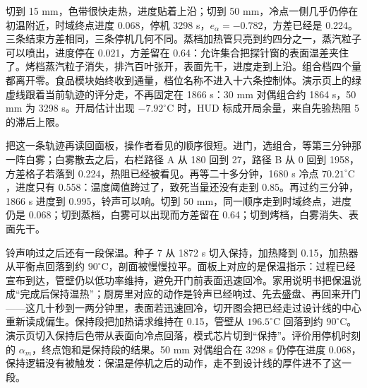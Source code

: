 切到 15 mm，色带很快走热，进度贴着上沿；切到 50 mm，冷点一侧几乎仍停在初温附近，时域终点进度 0.068，停机 3298 s，\(e_{\alpha}=-0.782\)，方差已经是 0.224。三条结束方差相同，三条停机几何不同。蒸档加热管只亮到约四分之一，蒸汽粒子可以喷出，进度停在 0.021，方差留在 0.64：允许集合把探针窗的表面温差夹住了。烤档蒸汽粒子消失，排汽百叶张开，表面先干，进度走到上沿。组合档四个量都离开零。食品模块始终收到通量，档位名称不进入十六条控制体。演示页上的绿虚线跟着当前轨迹的评分走，不再固定在 1866 s：30 mm 对偶组合约 1864 s，50 mm 为 3298 s。开局估计出现 \(-7.92^\circ\mathrm{C}\) 时，HUD 标成开局余量，来自先验热阻 5 的滞后上限。

把这一条轨迹再读回面板，操作者看见的顺序很短。进门，选组合，等第三分钟那一阵白雾；白雾散去之后，右栏路径 A 从 180 回到 27，路径 B 从 0 回到 1958，方差格子若落到 0.224，热阻已经被看见。再等二十多分钟，1680 s 冷点 \(70.21^\circ\mathrm{C}\)，进度只有 0.558：温度阈值跨过了，致死当量还没有走到 0.85。再过约三分钟，1866 s 进度到 0.995，铃声可以响。切到 50 mm，同一顺序走到时域终点，进度仍是 0.068；切到蒸档，白雾可以出现而方差留在 0.64；切到烤档，白雾消失、表面先干。

铃声响过之后还有一段保温。种子 7 从 1872 s 切入保持，加热降到 0.15，加热器从平衡点回落到约 \(90^\circ\mathrm{C}\)，剖面被慢慢拉平。面板上对应的是保温指示：过程已经宣布到达，管壁仍以低功率维持，避免开门前表面迅速回冷。家用说明书把保温说成“完成后保持温热”；厨房里对应的动作是铃声已经响过、先去盛盘、再回来开门——这几十秒到一两分钟里，表面若迅速回冷，切开图会把已经走过设计线的中心重新读成偏生。保持段把加热请求维持在 0.15，管壁从 \(196.5^\circ\mathrm{C}\) 回落到约 \(90^\circ\mathrm{C}\)。演示页切入保持后色带从表面向冷点回落，模式芯片切到“保持”。评价用停机时刻的 \(\alpha_m\)，终点饱和是保持段的结果。50 mm 对偶组合在 3298 s 仍停在进度 0.068，保持逻辑没有被触发：保温是停机之后的动作，走不到设计线的厚件进不了这一段。
